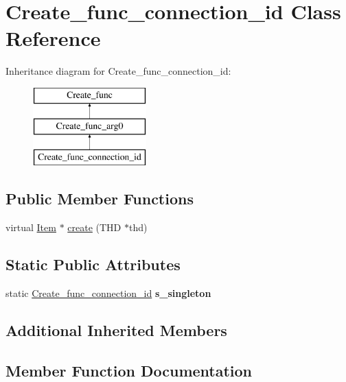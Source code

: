 \hypertarget{classCreate__func__connection__id}{}\section{Create\+\_\+func\+\_\+connection\+\_\+id Class Reference}
\label{classCreate__func__connection__id}
Inheritance diagram for Create\+\_\+func\+\_\+connection\+\_\+id\+:\begin{figure}[H]
\begin{center}
\leavevmode
\includegraphics[height=3.000000cm]{classCreate__func__connection__id}
\end{center}
\end{figure}
\subsection*{Public Member Functions}
\begin{DoxyCompactItemize}
\item 
virtual \mbox{\hyperlink{classItem}{Item}} $\ast$ \mbox{\hyperlink{classCreate__func__connection__id_a47268542db3c7410575501218c87e6ca}{create}} (T\+HD $\ast$thd)
\end{DoxyCompactItemize}
\subsection*{Static Public Attributes}
\begin{DoxyCompactItemize}
\item 
\mbox{\label{classCreate__func__connection__id_a908e673b92cc6ed806fb25fe5f744752}} 
static \mbox{\hyperlink{classCreate__func__connection__id}{Create\+\_\+func\+\_\+connection\+\_\+id}} {\bfseries s\+\_\+singleton}
\end{DoxyCompactItemize}
\subsection*{Additional Inherited Members}


\subsection{Member Function Documentation}
\mbox{\label{classCreate__func__connection__id_a47268542db3c7410575501218c87e6ca}} 
